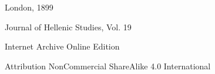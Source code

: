 \documentclass[a4paper, 11pt, oneside, polutonikogreek, english]{article}
\begin{document}
\begin{titlepage}
	\vspace*{\fill}%
	
	
	{London, 1899} %
 
        {\small Journal of Hellenic Studies, Vol. 19}

	\vspace{1\baselineskip} %

        Internet Archive Online Edition  %
	
	{\small Attribution NonCommercial ShareAlike 4.0 International } %
\end{titlepage}
\clearpage
\pagestyle{fancy}
\fancyhf{}
\cfoot{\Fontauri{\thepage}}
\Large
\setlength{\parskip}{1mm plus1mm minus1mm}
\tableofcontents
\clearpage
\section*{}
\end{document}
